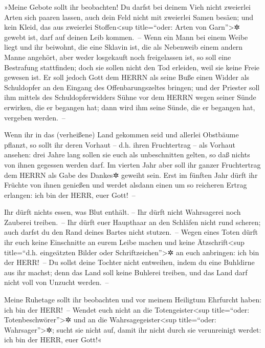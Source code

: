 »Meine Gebote sollt ihr beobachten! Du darfst bei deinem
Vieh nicht zweierlei Arten sich paaren lassen, auch dein Feld nicht mit
zweierlei Samen besäen; und kein Kleid, das aus zweierlei
Stoffen\textless sup title=``oder: Arten von Garn''\textgreater✲ gewebt
ist, darf auf deinen Leib kommen.~-- Wenn ein Mann bei
einem Weibe liegt und ihr beiwohnt, die eine Sklavin ist, die als
Nebenweib einem andern Manne angehört, aber weder losgekauft noch
freigelassen ist, so soll eine Bestrafung stattfinden; doch sie sollen
nicht den Tod erleiden, weil sie keine Freie gewesen ist.
Er soll jedoch Gott dem HERRN als seine Buße einen Widder
als Schuldopfer an den Eingang des Offenbarungszeltes bringen;
und der Priester soll ihm mittels des Schuldopferwidders
Sühne vor dem HERRN wegen seiner Sünde erwirken, die er begangen hat;
dann wird ihm seine Sünde, die er begangen hat, vergeben werden.~--

Wenn ihr in das (verheißene) Land gekommen seid und
allerlei Obstbäume pflanzt, so sollt ihr deren Vorhaut -- d.h. ihren
Fruchtertrag -- als Vorhaut ansehen: drei Jahre lang sollen sie euch als
unbeschnitten gelten, so daß nichts von ihnen gegessen werden darf.
Im vierten Jahr aber soll ihr ganzer Fruchtertrag dem
HERRN als Gabe des Dankes✲ geweiht sein. Erst im fünften
Jahr dürft ihr Früchte von ihnen genießen und werdet alsdann einen um so
reicheren Ertrag erlangen: ich bin der HERR, euer Gott!~--

Ihr dürft nichts essen, was Blut enthält. -- Ihr dürft
nicht Wahrsagerei noch Zauberei treiben.~-- Ihr dürft
euer Haupthaar an den Schläfen nicht rund scheren; auch darfst du den
Rand deines Bartes nicht stutzen.~-- Wegen eines Toten
dürft ihr euch keine Einschnitte an eurem Leibe machen und keine
Ätzschrift\textless sup title=``d.h. eingeätzten Bilder oder
Schriftzeichen''\textgreater✲ an euch anbringen: ich bin der HERR!~--
Du sollst deine Tochter nicht entweihen, indem du eine
Buhldirne aus ihr machst; denn das Land soll keine Buhlerei treiben, und
das Land darf nicht voll von Unzucht werden.~--

Meine Ruhetage sollt ihr beobachten und vor meinem
Heiligtum Ehrfurcht haben: ich bin der HERR!~-- Wendet
euch nicht an die Totengeister\textless sup title=``oder:
Totenbeschwörer''\textgreater✲ und an die Wahrsagegeister\textless sup
title=``oder: Wahrsager''\textgreater✲; sucht sie nicht auf, damit ihr
nicht durch sie verunreinigt werdet: ich bin der HERR, euer Gott!«

